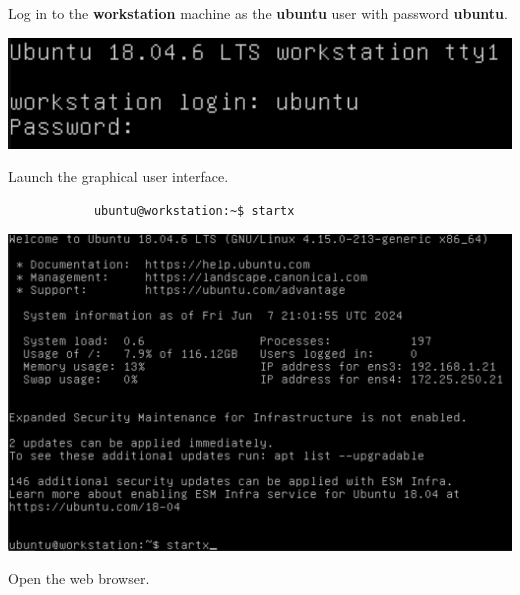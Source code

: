 \documentclass[letterpaper, 12pt]{article}
\begin{document}
\begin{enumerate}
    \begin{labstep}
        Log in to the \textbf{workstation} machine as the \textbf{ubuntu} user with password \textbf{ubuntu}.

        \begin{center}
            \includegraphics[width=\linewidth]{images/part1/step1.png}
        \end{center}
    \end{labstep}

    \begin{labstep}
        Launch the graphical user interface.

        \begin{lstlisting}
            ubuntu@workstation:~$ startx
        \end{lstlisting}

        \begin{center}
            \includegraphics[width=\linewidth]{images/part1/step2.png}
        \end{center}
    \end{labstep}

    \begin{labstep}
        Open the web browser.


\end{labstep}
\end{enumerate}
\end{document}
